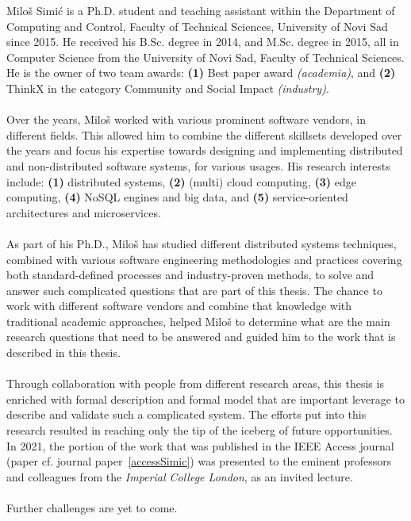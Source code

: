 \noindent
Milo\v s Simi\'c is a Ph.D. student and teaching assistant within the Department of Computing and Control, Faculty of Technical Sciences,  University of Novi Sad since 2015. He received his B.Sc. degree in 2014, and M.Sc. degree in 2015, all in Computer Science from the University of Novi Sad, Faculty of Technical Sciences. He is the owner of two team awards: \textbf{(1)} Best paper award \emph{(academia)}, and \textbf{(2)} ThinkX in the category Community and Social Impact \emph{(industry)}.\\\\
\noindent
Over the years, Milo\v s worked with various prominent software vendors, in different fields. This allowed him to combine the different skillsets developed over the years and focus his expertise towards designing and implementing distributed and non-distributed software systems, for various usages. His research interests include: \textbf{(1)} distributed systems, \textbf{(2)} (multi) cloud computing, \textbf{(3)} edge computing, \textbf{(4)} NoSQL engines and big data, and \textbf{(5)} service-oriented architectures and microservices.\\\\
\noindent
As part of his Ph.D., Milo\v s has studied different distributed systems techniques, combined with various software engineering methodologies and practices covering both standard-defined processes and industry-proven methods, to solve and answer such complicated questions that are part of this thesis. The chance to work with different software vendors and combine that knowledge with traditional academic approaches, helped Miloš to determine what are the main research questions that need to be answered and guided him to the work that is described in this thesis.\\\\
\noindent
Through collaboration with people from different research areas, this thesis is enriched with formal description and formal model that are important leverage to describe and validate such a complicated system. The efforts put into this research resulted in reaching only the tip of the iceberg of future opportunities. In 2021, the portion of the work that was published in the IEEE Access journal (paper cf. journal paper~\ref{accessSimic}) was presented to the eminent professors and colleagues from the \emph{Imperial College London}, as an invited lecture.\\\\

\noindent
Further challenges are yet to come.
%
%